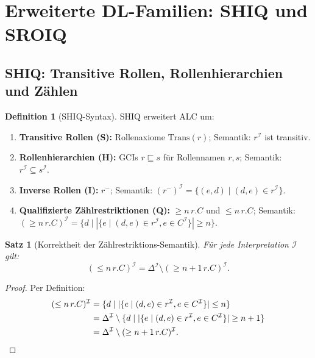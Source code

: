 ﻿\documentclass[a4paper,12pt]{article}
\theoremstyle{definition}
\newtheorem{definition}{Definition}[section]
\theoremstyle{plain}
\newtheorem{satz}{Satz}[section]
\theoremstyle{remark}
\newcommand{\interp}[1]{\ensuremath{\mathcal{#1}}}
\newcommand{\Dom}[1]{\ensuremath{\Delta^{\interp{#1}}}}
\begin{document}
\section{Erweiterte DL-Familien: SHIQ und SROIQ}
\label{sec:shiq-sroiq}

\subsection{SHIQ: Transitive Rollen, Rollenhierarchien und Z{\"{a}}hlen}

\begin{definition}[SHIQ-Syntax]
\textsf{SHIQ} erweitert \textsf{ALC} um:
\begin{enumerate}[label=(\roman*)]
  \item \textbf{Transitive Rollen (S):}
        Rollenaxiome $\mathrm{Trans}(r)$;
        Semantik: $r^\interp{I}$ ist transitiv.
  \item \textbf{Rollenhierarchien (H):}
        GCIs $r \sqsubseteq s$ f{\"{u}}r Rollennamen $r,s$;
        Semantik: $r^\interp{I} \subseteq s^\interp{I}$.
  \item \textbf{Inverse Rollen (I):}
        $r^-$; Semantik: $(r^-)^\interp{I} = \{(e,d) \mid (d,e) \in r^\interp{I}\}$.
  \item \textbf{Qualifizierte Z{\"{a}}hlrestriktionen (Q):}
        $\geq n\,r.C$ und $\leq n\,r.C$;
        Semantik: $(\geq n\,r.C)^\interp{I} = \{d \mid |\{e \mid (d,e) \in r^\interp{I}, e \in C^\interp{I}\}| \geq n\}$.
\end{enumerate}
\end{definition}

\begin{satz}[Korrektheit der Z{\"{a}}hlrestriktions-Semantik]
\label{satz:zaehlung}
F{\"{u}}r jede Interpretation $\interp{I}$ gilt:
\[
  (\leq n\,r.C)^\interp{I} =
  \Dom{I} \setminus (\geq n+1\,r.C)^\interp{I}.
\]
\end{satz}

\begin{proof}
Per Definition:
\begin{align*}
  (\leq n\,r.C)^\interp{I}
  &= \{d \mid |\{e \mid (d,e) \in r^\interp{I}, e \in C^\interp{I}\}| \leq n\} \\
  &= \Dom{I} \setminus \{d \mid |\{e \mid (d,e) \in r^\interp{I},
    e \in C^\interp{I}\}| \geq n+1\} \\
  &= \Dom{I} \setminus (\geq n+1\,r.C)^\interp{I}. \qedhere
\end{align*}
\end{proof}
\end{document}
